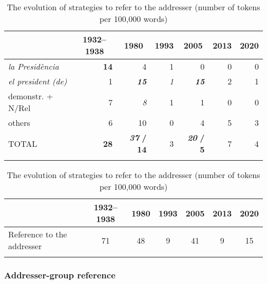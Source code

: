 \documentclass[output=paper]{langscibook}
\begin{document}
\begin{table}
\begin{tabular}{ccccccc}
\lsptoprule
& {{1932–1938}} & {{1980}} & {{1993}} & {{2005}} & {2013} & {{2020}}\\
\midrule
\multicolumn{1}{l}{\itshape{{la Presidència}}} & \multicolumn{1}{r}{\textbf{14}} & \multicolumn{1}{r}{4} & \multicolumn{1}{r}{1} & \multicolumn{1}{r}{0} & \multicolumn{1}{r}{0} & \multicolumn{1}{r}{0}\\
\multicolumn{1}{l}{\itshape{{el president (de)}}} & \multicolumn{1}{r}{1} & \multicolumn{1}{r}{\textbf{\textit{15}}} & \multicolumn{1}{r}{\itshape 1} & \multicolumn{1}{r}{\textbf{\textit{15}}} & \multicolumn{1}{r}{2} & \multicolumn{1}{r}{1}\\
\multicolumn{1}{l}{ {demonstr. + N/Rel}} & \multicolumn{1}{r}{7} & \multicolumn{1}{r}{\itshape 8} & \multicolumn{1}{r}{1} & \multicolumn{1}{r}{1} & \multicolumn{1}{r}{0} & \multicolumn{1}{r}{0}\\
\multicolumn{1}{l}{{others}} & \multicolumn{1}{r}{6} & \multicolumn{1}{r}{10} & \multicolumn{1}{r}{0} & \multicolumn{1}{r}{4} & \multicolumn{1}{r}{5} & \multicolumn{1}{r}{3}\\
\midrule
\multicolumn{1}{l}{{TOTAL}} & \multicolumn{1}{r}{\textbf{28}} & \multicolumn{1}{r}{\textbf{\textit{37}} \textbf{/} \textbf{14}} & \multicolumn{1}{r}{3} & \multicolumn{1}{r}{\textbf{\textit{20}} \textbf{/} \textbf{5}} & \multicolumn{1}{r}{7} & \multicolumn{1}{r}{4}\\
\lspbottomrule
\end{tabular}
\caption{The evolution of  strategies to refer to the addresser (number of tokens per 100,000 words)}
\label{tab:nogue:2}
\end{table}

\begin{table}
\begin{tabularx}{\textwidth}{Q cccccc} 
\lsptoprule
                           & 1932--1938 & 1980 & 1993 & 2005 & 2013 & 2020\\
\midrule
Reference to the addresser & 71 & 48 & 9 & 41 & 9 & 15\\
\lspbottomrule
\end{tabularx}
\caption{The evolution of  strategies to refer to the addresser (number of tokens per 100,000 words)}
\label{tab:nogue:3}
\end{table}


\subsubsection{Addresser-group reference}\label{sec:nogue:2.1.2}
\end{document}
